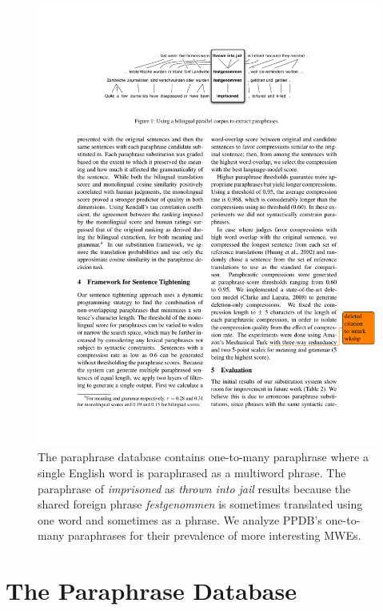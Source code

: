 \documentclass[11pt]{article}
\begin{document}
\begin{figure}
\begin{center}
\includegraphics[width=\linewidth]{figs/paraphrase-by-pivoting}
\caption{The paraphrase database contains one-to-many paraphrase where a single English word is paraphrased as a multiword phrase.  The paraphrase of {\it imprisoned} as {\it thrown into jail} results because the shared foreign phrase {\it festgenommen} is sometimes translated using one word and sometimes as a phrase. We analyze PPDB's one-to-many paraphrases for their prevalence of more interesting MWEs.  }\label{bilingual-pivoting}
\end{center}
\end{figure}



\section{The Paraphrase Database}
\end{document}
